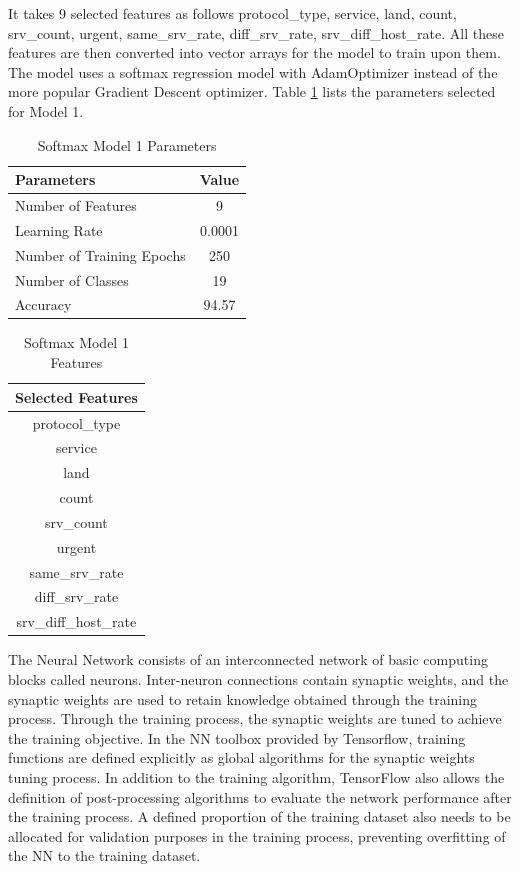 \documentclass[12pt]{article}
\theoremstyle{definition}
\begin{document}
			It takes 9 selected features as follows  protocol\_type, service, land, count, srv\_count, urgent, same\_srv\_rate, diff\_srv\_rate, srv\_diff\_host\_rate. All these features are then converted into vector arrays for the model to train upon them. The model uses a softmax regression model with AdamOptimizer instead of the more popular Gradient Descent optimizer. Table \ref{tab:model-1-params} lists the parameters selected for Model 1.
			
			\begin{table}[h!]
				\centering
				\caption{Softmax Model 1 Parameters}
				\label{tab:model-1-params}
				\begin{tabular}{|l|c|}
					\hline
					\bfseries{Parameters} & \textbf{Value} \\ \hline
					Number of Features & 9 \\
					Learning Rate & 0.0001 \\
					Number of Training Epochs & 250 \\
					Number of Classes & 19 \\ 
					Accuracy & 94.57 \\
					\hline	
				\end{tabular}
				
			\end{table}
		
			\begin{table}[h!]
				\centering
				\caption{Softmax Model 1 Features}
				\label{tab:model-1-features}
				\begin{tabular}{|c|}
					\hline
					\bfseries{Selected Features} \\ \hline
					protocol\_type \\
					service \\
					land \\
					count \\
					srv\_count \\
					urgent \\
					same\_srv\_rate \\
					diff\_srv\_rate \\
					srv\_diff\_host\_rate \\
					\hline	
				\end{tabular}
				
			\end{table}
		The Neural Network consists of an interconnected network of basic computing blocks called
		neurons. Inter-neuron connections contain synaptic weights, and the synaptic weights are
		used to retain knowledge obtained through the training process. Through the training
		process, the synaptic weights are tuned to achieve the training objective. In the NN
		toolbox provided by Tensorflow, training functions are defined explicitly as global
		algorithms for the synaptic weights tuning process. In addition to the training algorithm,
		TensorFlow also allows the definition of post-processing algorithms to evaluate the
		network performance after the training process. A defined proportion of the training
		dataset also needs to be allocated for validation purposes in the training process,
		preventing overfitting of the NN to the training dataset.
\end{document}
